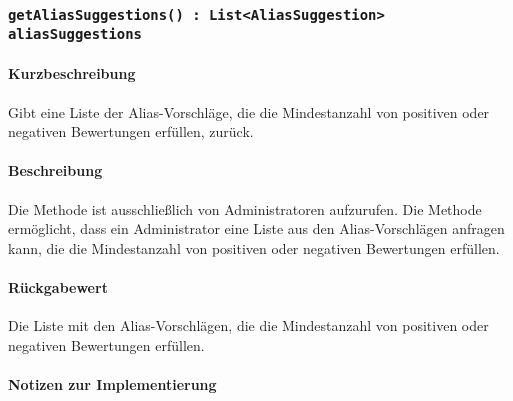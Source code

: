 \subsubsection{\texttt{getAliasSuggestions() : List<AliasSuggestion> aliasSuggestions}}%
\paragraph*{Kurzbeschreibung}
Gibt eine Liste der Alias-Vorschläge, die die Mindestanzahl von positiven oder negativen Bewertungen erfüllen, zurück.
\paragraph*{Beschreibung}
Die Methode ist ausschließlich von Administratoren aufzurufen.
Die Methode ermöglicht, dass ein Administrator eine Liste aus den Alias-Vorschlägen anfragen kann, die die Mindestanzahl von positiven oder negativen Bewertungen erfüllen.
\paragraph*{Rückgabewert}
Die Liste mit den Alias-Vorschlägen, die die Mindestanzahl von positiven oder negativen Bewertungen erfüllen.

\paragraph*{Notizen zur Implementierung}%
